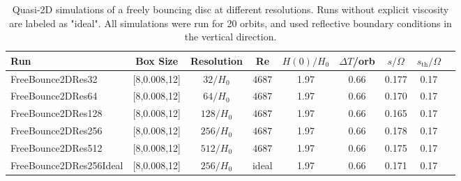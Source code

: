\documentclass[fleqn,usenatbib]{mnras}
\begin{document}
\begin{table}
\centering
\caption{Quasi-2D simulations of a freely bouncing disc at different resolutions. Runs without explicit viscosity are labeled as "ideal". All simulations were run for 20 orbits, and used reflective boundary conditions in the vertical direction.}
\label{TABLE_3DSimsFreelyBouncing_ComparisonExplicitNumericalViscosity}
	\begin{tabular}{lcccccccr}
		\hline
		Run	& Box Size & Resolution & Re  & $H(0)/H_0$ & $\Delta T$/orb & $s/\Omega$&$s_{\text{th}}/\Omega$\\ 
        \hline
  FreeBounce2DRes32  & [8,0.008,12] & $32/H_0$ & $4687$ & 1.97 & 0.66 & 0.177 & 0.17\\
  FreeBounce2DRes64  & [8,0.008,12] & $64/H_0$ & $4687$ & 1.97 & 0.66 & 0.170 & 0.17\\
  FreeBounce2DRes128  & [8,0.008,12] & $128/H_0$ & $4687$ & 1.97 & 0.66 & 0.165 & 0.17 &\\
  FreeBounce2DRes256  & [8,0.008,12] & $256/H_0$ & $4687$ & 1.97 & 0.66 & 0.178 & 0.17 &\\
  FreeBounce2DRes512  & [8,0.008,12] & $512/H_0$ & $4687$ & 1.97 & 0.66 & 0.175 & 0.17 &\\
  \hline
FreeBounce2DRes256Ideal  & [8,0.008,12] & $256/H_0$ & ideal & 1.97  & 0.66 & 0.171 & 0.17 &\\
		\hline
	\end{tabular}
\end{table}
\end{document}
